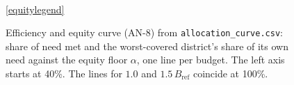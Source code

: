 \begin{figure}[t]
\\[2pt]
\ref{equitylegend}
\caption{Efficiency and equity curve (AN-8) from \texttt{allocation\_curve.csv}: share of need met and the
worst-covered district's share of its own need against the equity floor $\alpha$, one line per budget. The left axis starts at 40\%. The lines for $1.0$ and $1.5\,B_{\text{ref}}$ coincide at 100\%.}
\label{fig:equity}
\end{figure}
